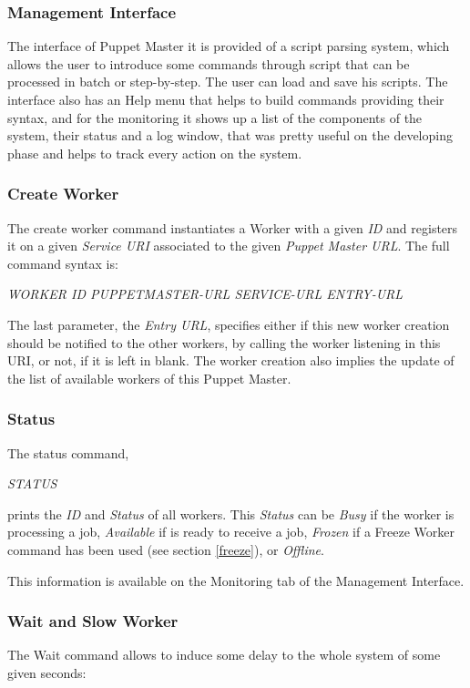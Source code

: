 \documentclass[times, 10pt,twocolumn]{article}
\begin{document}
            \subsubsection{Management Interface}
            The interface of Puppet Master it is provided of a script parsing system, which allows the user to introduce some commands through script that can be processed in batch or step-by-step. The user can load and save his scripts. The interface also has an Help menu that helps to build commands providing their syntax, and for the monitoring it shows up a list of the components of the system, their status and a log window, that was pretty useful on the developing phase and helps to track every action on the system.
            \subsubsection{Create Worker}
            The create worker command instantiates a Worker with a given \emph{ID} and registers it on a given \emph{Service URI} associated to the given \emph{Puppet Master URL}. The full command syntax is: 
            
            \emph{WORKER ID PUPPETMASTER-URL SERVICE-URL ENTRY-URL} 
            
            The last parameter, the \emph{Entry URL}, specifies either if this new worker creation should be notified to the other workers, by calling the worker listening in this URI, or not, if it is left in blank.
            The worker creation also implies the update of the list of available workers of this Puppet Master.
            \subsubsection{Status}
            
            The status command,  
            
            \emph{STATUS}
            
            prints the \emph{ID} and \emph{Status} of all workers. This \emph{Status} can be  \emph{Busy} if the worker is processing a job, \emph{Available} if is ready to receive a job, \emph{Frozen} if a Freeze Worker command has been used (see section \ref{freeze}), or \emph{Offline}.
            
            This information is available on the Monitoring tab of the Management Interface. 
                   	
            \subsubsection{Wait and Slow Worker}
			The Wait command allows to induce some delay to the whole system of some given seconds:
            
\end{document}
